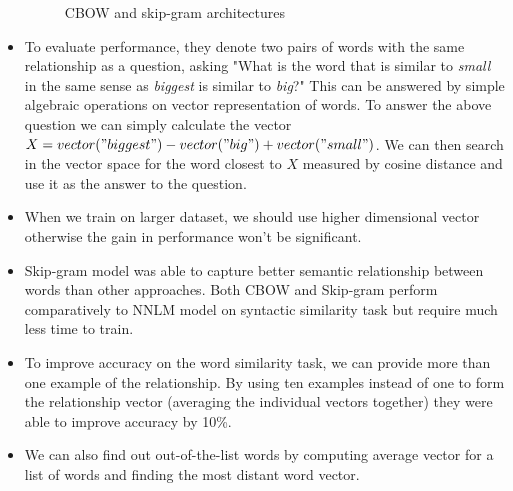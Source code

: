 \documentclass{article}
\begin{document}
\begin{itemize}
\begin{figure}[H]
        \caption{CBOW and skip-gram architectures}
        \label{fig:Figure 1}
    \end{figure}
    \item To evaluate performance, they denote two pairs of words with the same relationship as a question, asking "What is the word that is similar to \textit{small} in the same sense as \textit{biggest} is similar to \textit{big}?" This can be answered by simple algebraic operations on vector representation of words. To answer the above question we can simply calculate the vector $X=vector("biggest")-vector("big")+vector("small")$. We can then search in the vector space for the word closest to $X$ measured by cosine distance and use it as the answer to the question. 
    \item When we train on larger dataset, we should use higher dimensional vector otherwise the gain in performance won't be significant.
    \item Skip-gram model was able to capture better semantic relationship between words than other approaches. Both CBOW and Skip-gram perform comparatively to NNLM model on syntactic similarity task but require much less time to train.
    \item To improve accuracy on the word similarity task, we can provide more than one example of the relationship. By using ten examples instead of one to form the relationship vector (averaging the individual vectors together) they were able to improve accuracy by 10\%.
    \item We can also find out out-of-the-list words by computing average vector for a list of words and finding the most distant word vector.

\end{itemize}
\end{document}
